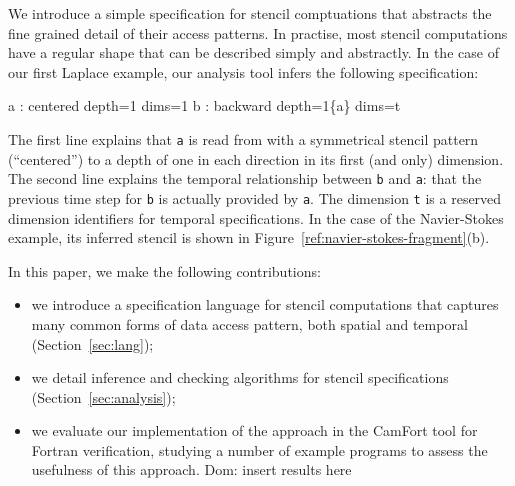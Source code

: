 \documentclass[9pt]{sigplanconf}
\newcommand{\dnote}[1]{\textcolor{darkpurple}{Dom: #1}}
\theoremstyle{definition}
\begin{document}
We introduce a simple specification for stencil comptuations
that abstracts the fine grained detail of their access patterns.
In practise, most stencil computations have a regular shape that
can be described simply and abstractly. In the case of our
first Laplace example, our analysis tool infers the following specification:
%
\begin{SpecVerbatim}
a : centered depth=1 dims=1
b : backward depth=1\{a\} dims=t
\end{SpecVerbatim}
%
The first line explains that \texttt{a} is read from
with a symmetrical stencil pattern (``centered'') to a depth
of one in each direction in its first (and only) dimension.
The second line explains the temporal relationship between
\texttt{b} and \texttt{a}: that the previous time step for \texttt{b}
is actually provided by \texttt{a}. The dimension \texttt{t} is a
reserved dimension identifiers for temporal specifications. In
the case of the Navier-Stokes example, its inferred stencil is shown
in Figure~\ref{ref:navier-stokes-fragment}(b).

In this paper, we make the following contributions:
%
\begin{itemize}
\item we introduce a specification language for
stencil computations that captures many common forms
of data access pattern, both spatial and temporal (Section~\ref{sec:lang});
\item we detail inference and checking
algorithms for stencil specifications (Section~\ref{sec:analysis});
\item we evaluate our implementation of the approach
in the CamFort tool for Fortran verification, studying
a number of example programs to assess the usefulness
of this approach.
\dnote{insert results here}
\end{itemize}
%
\end{document}
